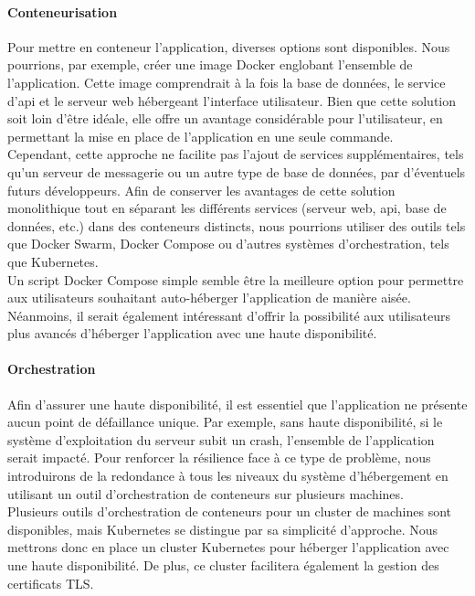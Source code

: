 \paragraph{Conteneurisation}
Pour mettre en conteneur l'application, diverses options sont disponibles.
Nous pourrions, par exemple, créer une image Docker englobant l'ensemble de l'application.
Cette image comprendrait à la fois la base de données, le service d'\Gls{api} et le serveur web hébergeant l'interface utilisateur.
Bien que cette solution soit loin d'être idéale, elle offre un avantage considérable pour l'utilisateur, en permettant la mise en place de l'application en une seule commande.\\

Cependant, cette approche ne facilite pas l'ajout de services supplémentaires, tels qu'un serveur de messagerie ou un autre type de base de données, par d'éventuels futurs développeurs.
Afin de conserver les avantages de cette solution monolithique tout en séparant les différents services (serveur web, \Gls{api}, base de données, etc.) dans des conteneurs distincts,
nous pourrions utiliser des outils tels que Docker Swarm, Docker Compose ou d'autres systèmes d'orchestration, tels que Kubernetes. \\

Un script Docker Compose simple semble être la meilleure option pour permettre aux utilisateurs souhaitant auto-héberger l'application de manière aisée.
Néanmoins, il serait également intéressant d'offrir la possibilité aux utilisateurs plus avancés d'héberger l'application avec une haute disponibilité.

\paragraph{Orchestration}
Afin d'assurer une haute disponibilité, il est essentiel que l'application ne présente aucun point de défaillance unique.
Par exemple, sans haute disponibilité, si le système d'exploitation du serveur subit un crash, l'ensemble de l'application serait impacté.
Pour renforcer la résilience face à ce type de problème,
nous introduirons de la redondance à tous les niveaux du système d'hébergement en utilisant un outil d'orchestration de conteneurs sur plusieurs machines.\\

Plusieurs outils d'orchestration de conteneurs pour un cluster de machines sont disponibles, mais Kubernetes se distingue par sa simplicité d'approche.
Nous mettrons donc en place un cluster Kubernetes pour héberger l'application avec une haute disponibilité.
De plus, ce cluster facilitera également la gestion des certificats TLS\@.\\

